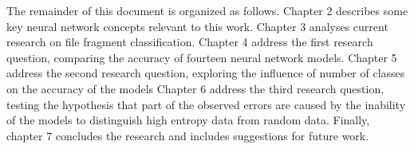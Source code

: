 
The remainder of this document is organized as follows.
    Chapter 2 describes some key neural network concepts relevant to this work. 
    Chapter 3 analyses current research on file fragment classification.
    Chapter 4 address the first research question, comparing the accuracy of fourteen neural network models.
    Chapter 5 address the second research question, exploring the influence of number of classes on the accuracy of the models
    Chapter 6 address the third research question, testing the hypothesis that part of the observed errors are caused by the inability of the models to distinguish high entropy data from random data.    
    Finally, chapter 7 concludes the research and includes suggestions for future work.
    
